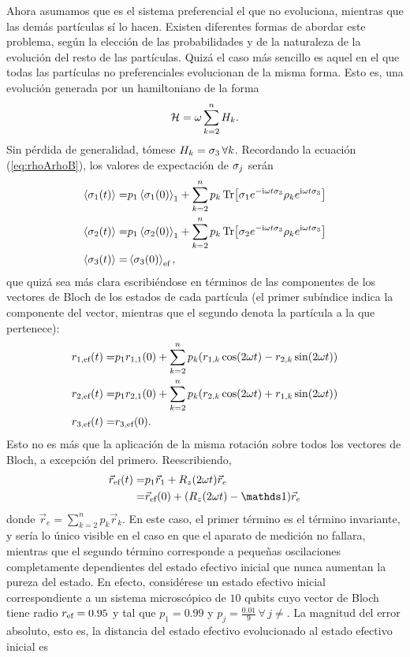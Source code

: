 Ahora asumamos que es el sistema preferencial el que no evoluciona, mientras que las demás partículas sí lo hacen. Existen diferentes formas de abordar este problema, según la elección de las probabilidades y de la naturaleza de la evolución del resto de las partículas. Quizá el caso más sencillo es aquel en el que todas las partículas no preferenciales evolucionan de la misma forma. Esto es, una evolución generada por un hamiltoniano de la forma
\begin{equation}
    \mathcal{H}=\omega \sum_{k=2}^{n}H_{k}.\nonumber
\end{equation}
Sin pérdida de generalidad, tómese $H_{k}=\sigma_{3}\,\forall k$. Recordando la ecuación (\ref{eq:rhoArhoB}), los valores de expectación de $\sigma_{j}$ serán
\begin{align}
    \expval{\sigma_{1}(t)}=&p_{1} \expval{\sigma_{1}(0)}_{1}+\sum_{k=2}^{n}p_{k}\Tr[\sigma_{1}e^{-\text{i}\omega t\sigma_{3}} \rho_{k} e^{\text{i}\omega t\sigma_{3}}]\nonumber\\
    \expval{\sigma_{2}(t)}=&p_{1} \expval{\sigma_{2}(0)}_{1}+\sum_{k=2}^{n}p_{k}\Tr[\sigma_{2}e^{-\text{i}\omega t\sigma_{3}} \rho_{k} e^{\text{i}\omega t\sigma_{3}}]\nonumber\\
    \expval{\sigma_{3}(t)}=&\expval{\sigma_{3}(0)}_{\text{ef}},\nonumber
\end{align}
que quizá sea más clara escribiéndose en términos de las componentes de los vectores de Bloch de los estados de cada partícula (el primer subíndice indica la componente del vector, mientras que el segundo denota la partícula a la que pertenece):
\begin{align}
    r_{1,\text{ef}}(t)=&p_{1}r_{1,1}(0)+\sum_{k=2}^{n}p_{k}(r_{1,k}\cos(2\omega t)-r_{2,k}\sin(2\omega t))\nonumber\\
    r_{2,\text{ef}}(t)=&p_{1}r_{2,1}(0)+\sum_{k=2}^{n}p_{k}(r_{2,k}\cos(2\omega t)+r_{1,k}\sin(2\omega t))\nonumber\\
    r_{3,\text{ef}}(t)=&r_{3,\text{ef}}(0).\nonumber
\end{align}
Esto no es más que la aplicación de la misma rotación sobre todos los vectores de Bloch, a excepción del primero. Reescribiendo,
\begin{align}
    \vec{r}_{\ef}(t)=&p_{1}\vec{r}_{1}+R_{z}(2\omega t)\vec{r}_{e}\nonumber\\
    =&\vec{r}_{\ef}(0)+(R_{z}(2\omega t)-\Id)\vec{r}_{e}\nonumber
\end{align}
donde $\vec{r}_{e}=\sum_{k=2}^{n}p_{k}\vec{r}_{k}$.
En este caso, el primer término es el término invariante, y sería lo único visible en el caso en que el aparato de medición no fallara, mientras que el segundo término corresponde a pequeñas oscilaciones completamente dependientes del estado efectivo inicial que nunca aumentan la pureza del estado. En efecto, considérese un estado efectivo inicial correspondiente a un sistema microscópico de $10$ qubits cuyo vector de Bloch tiene radio $r_{\text{ef}}=0.95$ y tal que $p_{1}=0.99$ y $p_{j}=\frac{0.01}{9}\,\forall\,j\neq $. La magnitud del error absoluto, esto es, la distancia del estado efectivo evolucionado al estado efectivo inicial es
